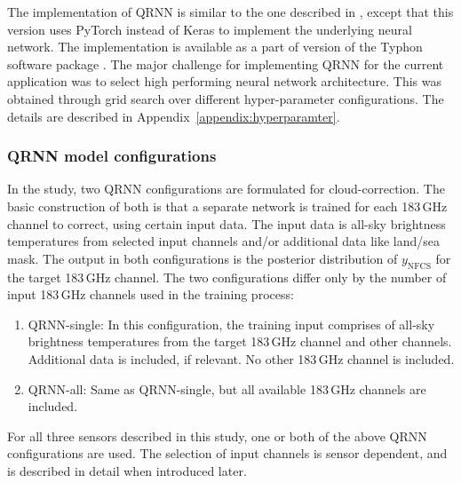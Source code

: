 \documentclass[amt, manuscript]{copernicus}
\newcommand{\ynfcs}{y_\text{NFCS}}
\begin{document}
The implementation of QRNN is similar to the one described in
\citet{pfreundschuh:aneur:18}, except that this version uses PyTorch
\citep{paszke2017automatic} instead of Keras \citep{chollet2015keras} to
implement the underlying neural network. The implementation is available as a
part of version of the Typhon software package \citep{typhonv08}. The major
challenge for implementing QRNN for the current application was to select high
performing neural network architecture. This was obtained through grid search
over different hyper-parameter configurations. The details are described in
Appendix~\ref{appendix:hyperparamter}.

\subsubsection{QRNN model configurations}
%
\label{sec:QRNN_configuration}
In the study, two QRNN configurations are formulated for cloud-correction. The
basic construction of both is that a separate network is trained for each
183\,GHz channel to correct, using certain input data. The input data is all-sky brightness temperatures from selected input channels and/or additional data like land/sea mask. The
output in both configurations is the posterior distribution of $\ynfcs$ for
the target 183\,GHz channel. The two configurations differ only by the number of
input 183\,GHz channels used in the training process:

\begin{enumerate}
	\item QRNN-single: In this configuration, the training input comprises of  all-sky brightness temperatures from the target 183\,GHz channel and other channels. Additional data is included, if relevant. No other 183\,GHz channel is included.  
	
	\item QRNN-all: Same as QRNN-single, but all available 183\,GHz channels are included.      
\end{enumerate}

For all three sensors described in this study, one or both of the above QRNN configurations are used. The selection of input channels is sensor dependent, and is described in detail when introduced later.  
\end{document}
